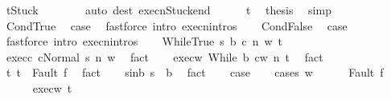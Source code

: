 \begin{isabellebody}
\ {\isachardoublequoteopen}t{\isacharequal}Stuck{\isachardoublequoteclose}\isanewline
\ \ \ \ \ \ \isamarkupfalse%
\ {\isacharparenleft}auto\ dest{\isacharcolon}\ execn{\isacharunderscore}Stuck{\isacharunderscore}end{\isacharparenright}\isanewline
\ \ \ \ \isamarkupfalse%
\ t\ \isamarkupfalse%
\ {\isacharquery}thesis\ \isamarkupfalse%
\ simp\isanewline
\ \ \isamarkupfalse%
\isanewline
{}\isamarkupfalse%
\isanewline
\ \ \isamarkupfalse%
\ CondTrue\ \isamarkupfalse%
\ {\isacharquery}case\ \isamarkupfalse%
\ {\isacharparenleft}fastforce\ intro{\isacharcolon}\ execn{\isachardot}intros{\isacharparenright}\isanewline
{}\isamarkupfalse%
\isanewline
\ \ \isamarkupfalse%
\ CondFalse\ \isamarkupfalse%
\ {\isacharquery}case\ \isamarkupfalse%
\ {\isacharparenleft}fastforce\ intro{\isacharcolon}\ execn{\isachardot}intros{\isacharparenright}\isanewline
{}\isamarkupfalse%
\isanewline
\ \ \isamarkupfalse%
\ {\isacharparenleft}WhileTrue\ s\ b\ c\ n\ w\ t{\isacharparenright}\ \isanewline
\ \ \isamarkupfalse%
\ exec{\isacharunderscore}c{\isacharcolon}\ {\isachardoublequoteopen}{\isasymGamma}{\isasymturnstile}{\isasymlangle}c{\isacharcomma}Normal\ s{\isasymrangle}\ {\isacharequal}n{\isasymRightarrow}\ w{\isachardoublequoteclose}\ \isamarkupfalse%
\ fact\isanewline
\ \ \isamarkupfalse%
\ exec{\isacharunderscore}w{\isacharcolon}\ {\isachardoublequoteopen}{\isasymGamma}{\isasymturnstile}{\isasymlangle}While\ b\ c{\isacharcomma}w{\isasymrangle}\ {\isacharequal}n{\isasymRightarrow}\ t{\isachardoublequoteclose}\ \isamarkupfalse%
\ fact\isanewline
\ \ \isamarkupfalse%
\ t{\isacharcolon}\ {\isachardoublequoteopen}t\ {\isacharequal}\ Fault\ f{\isachardoublequoteclose}\ \isamarkupfalse%
\ fact\isanewline
\ \ \isamarkupfalse%
\ s{\isacharunderscore}in{\isacharunderscore}b{\isacharcolon}\ {\isachardoublequoteopen}s\ {\isasymin}\ b{\isachardoublequoteclose}\ \isamarkupfalse%
\ fact\isanewline
\ \ \isamarkupfalse%
\ {\isacharquery}case\isanewline
\ \ \isamarkupfalse%
\ {\isacharparenleft}cases\ w{\isacharparenright}\isanewline
\ \ \ \ \isamarkupfalse%
\ {\isacharparenleft}Fault\ f{\isacharprime}{\isacharparenright}\isanewline
\ \ \ \ \isamarkupfalse%
\ exec{\isacharunderscore}w\ t\ \isamarkupfalse%

\end{isabellebody}
